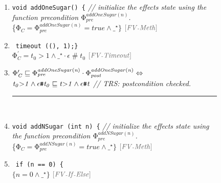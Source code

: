 \documentclass[acmsmall,10pt,review]{acmart}
\newcommand{\siderule}[1]{
\code{\footnotesize{\textcolor{mGray}{#1}}}}
\newcommand{\effect}{{\ensuremath{\mathrm{\Phi}}}}
\newcommand{\anyevent}[1]{{\textcolor{darkred}
{{\textbf{\small #1}}}}}
\newcommand{\code}[1]{{\tt{\ensuremath{\m{#1}}}}}
\newcommand{\CONTAIN}{\sqsubseteq}
\newcommand{\m}{\mathit}
\newcommand{\mysharp}{{\mathrel{\texttt{\#}}}}
\begin{document}
{
\begin{figure}[!ht]
     \begin{minipage}[c]{\columnwidth}
         \centering
         {%
         \begin{enumerate}
\item \lstinline|void addOneSugar() {| \textcolor{mGray}{\footnotesize 
\quad \emph{// initialize the effects state using the function precondition \code{\effect_{pre}^{addOneSugar(n)}}.}} \\
\textcolor{darklavender}{\{\code{\effect_C {=}\effect_{pre}^{addOneSugar(n)} =  true \wedge  \_^\star \} }} 
\quad \siderule{\scriptsize[FV\text{-}Meth] } \\

\item ~\qquad \lstinline|timeout ((), 1);}| \\
\textcolor{darklavender}{\code{\effect_C^\prime {=} t_0{>}1   \wedge \_^\star \cdot \epsilon \mysharp t_0  }} 
\quad \siderule {\scriptsize [FV\text{-}Timeout]}
\item 
\textcolor{darkred}{\code{
\effect_C^\prime \CONTAIN \effect_{pre}^{addOneSugar(n)} \cdot \effect_{post}^{addOneSugar(n)} \Leftrightarrow  }} 
 \textcolor{darkred}{\code{\code{\code{t_0{>}1   \wedge \epsilon \mysharp t_0}
 \CONTAIN t{>}1   \wedge \epsilon \mysharp t }}}
 \quad \textcolor{mGray}{\footnotesize  \emph{// TRS: postcondition checked. }}
 \\ 
  \noindent\rule{0.92\columnwidth}{0.4pt}
  \vspace{2mm}
~\\
\item \lstinline|void addNSugar (int n) {| \textcolor{mGray}{\footnotesize 
\quad \emph{// initialize the effects state using the function precondition \code{\effect_{pre}^{addNSugar(n)}}.}} \\
     \textcolor{darklavender}{\{\code{\effect_C {=}\effect_{pre}^{addNSugar(n)} =  true \wedge  \_^\star \} }} 
      \quad \siderule{\scriptsize[FV\text{-}Meth] } \\
     \item ~\qquad \lstinline|if (n == 0) {| \\
     \textcolor{darklavender}{\code{\{ n{=}0 \wedge  \_^\star \}  }} 
     \quad \siderule{\scriptsize [FV\text{-}If\text{-}Else]}

\end{enumerate}}
\end{minipage}
\end{figure}}
\end{document}
